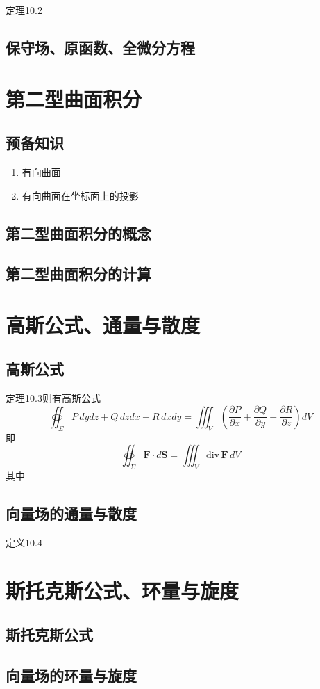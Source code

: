 定理10.2\quad

\subsection{保守场、原函数、全微分方程}

\section{第二型曲面积分}
\subsection{预备知识}
\begin{enumerate}
    \item 有向曲面
    \item 有向曲面在坐标面上的投影
\end{enumerate}

\subsection{第二型曲面积分的概念}

\subsection{第二型曲面积分的计算}

\section{高斯公式、通量与散度}
\subsection{高斯公式}

定理10.3\quad 则有高斯公式
\[
\oiint_\Sigma P\,dydz+Q\,dzdx+R\,dxdy
=\iiint_V\left(\frac{\partial P}{\partial x}+\frac{\partial Q}{\partial y}+\frac{\partial R}{\partial z}\right)dV
\]
即
\[
\oiint_\Sigma \boldsymbol{F}\cdot d\boldsymbol{S}
=\iiint_V \mathrm{div}\,\boldsymbol{F}\,dV
\]
其中

\subsection{向量场的通量与散度}

定义10.4\quad

\section{斯托克斯公式、环量与旋度}
\subsection{斯托克斯公式}

\subsection{向量场的环量与旋度}
